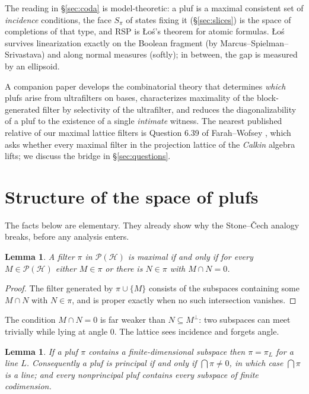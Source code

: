\documentclass[11pt,reqno]{amsart}
\newtheorem{lemma}[theorem]{Lemma}
\theoremstyle{definition}
\newcommand{\HH}{\mathcal{H}}
\newcommand{\PP}{\mathcal{P}}
\newcommand{\pluf}{\pi}
\begin{document}
The reading in \S\ref{sec:coda} is model-theoretic: a pluf is a maximal consistent
set of \emph{incidence} conditions, the face $S_\pluf$ of states fixing it
(\S\ref{sec:slices}) is the space of completions of that type, and RSP is \L o\'s's
theorem for atomic formulas. \L o\'s survives linearization exactly on the Boolean
fragment (by Marcus--Spielman--Srivastava) and along normal measures (softly); in between,
the gap is measured by an ellipsoid.

A companion paper \cite{FWII} develops the combinatorial theory that determines
\emph{which} plufs arise from ultrafilters on bases, characterizes maximality of the
block-generated filter by selectivity of the ultrafilter, and reduces the diagonalizability
of a pluf to the existence of a single \emph{intimate} witness.
The nearest published relative of our maximal lattice filters is Question 6.39 of
Farah--Wofsey \cite{FarahWofsey}, which asks whether every maximal filter in the projection
lattice of the \emph{Calkin} algebra lifts; we discuss the bridge in
\S\ref{sec:questions}.

\section{Structure of the space of plufs}\label{sec:struct}

The facts below are elementary. They already show why the Stone--\v{C}ech analogy
breaks, before any analysis enters.

\begin{lemma}\label{lem:maximality}
A filter $\pluf$ in $\PP(\HH)$ is maximal if and only if for every $M\in\PP(\HH)$ either
$M\in\pluf$ or there is $N\in\pluf$ with $M\cap N=0$.
\end{lemma}

\begin{proof}
The filter generated by $\pluf\cup\{M\}$ consists of the subspaces containing some
$M\cap N$ with $N\in\pluf$, and is proper exactly when no such intersection vanishes.
\end{proof}

The condition $M\cap N=0$ is far weaker than $N\subseteq M^{\perp}$: two subspaces can
meet trivially while lying at angle $0$. The lattice sees incidence and forgets angle.

\begin{lemma}\label{lem:findim}
If a pluf $\pluf$ contains a finite-dimensional subspace then $\pluf=\pluf_L$ for a line
$L$. Consequently a pluf is principal if and only if $\bigcap\pluf\neq0$, in which case
$\bigcap\pluf$ is a line; and every nonprincipal pluf contains every subspace of finite
codimension.
\end{lemma}
\end{document}
